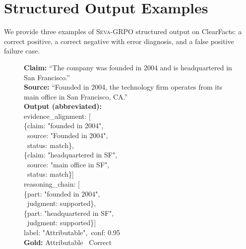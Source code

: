 \documentclass[11pt]{article}
\newcommand{\cmark}{\ding{51}}
\newcommand{\seva}{\textsc{Seva}\xspace}
\begin{document}
\section{Structured Output Examples}
\label{app:examples}

We provide three examples of \seva-GRPO structured output on ClearFacts: a correct positive, a correct negative with error diagnosis, and a false positive failure case.

\begin{figure}[!ht]
\centering
\begin{minipage}[t]{0.48\textwidth}
\begin{examplebox}[title={Ex.\,1: Correct ``Attributable''}]
\scriptsize
\textbf{Claim:} ``The company was founded in 2004 and is headquartered in San Francisco.''\\
\textbf{Source:} ``Founded in 2004, the technology firm operates from its main office in San Francisco, CA.''\\[1pt]
\textbf{Output (abbreviated):}\\[1pt]
{\ttfamily
\mbox{}\quad evidence\_alignment: [}\\
{\ttfamily\quad\quad\{claim: "founded in 2004",}\\
{\ttfamily\quad\quad\ source: "Founded in 2004",}\\
{\ttfamily\quad\quad\ status: match\},}\\
{\ttfamily\quad\quad\{claim: "headquartered in SF",}\\
{\ttfamily\quad\quad\ source: "main office in SF",}\\
{\ttfamily\quad\quad\ status: match\}]}\\
{\ttfamily\quad reasoning\_chain: [}\\
{\ttfamily\quad\quad\{part: "founded in 2004",}\\
{\ttfamily\quad\quad\ judgment: supported\},}\\
{\ttfamily\quad\quad\{part: "headquartered in SF",}\\
{\ttfamily\quad\quad\ judgment: supported\}]}\\
{\ttfamily\quad label: "Attributable",\ conf: 0.95}\\[2pt]
\textbf{Gold:} Attributable \quad \cmark\ Correct
\end{examplebox}
\end{minipage}\hfill
\begin{minipage}[t]{0.48\textwidth}
\begin{examplebox}[title={Ex.\,2: Correct ``Not Attributable''}]

\end{examplebox}
\end{minipage}
\end{figure}
\end{document}

